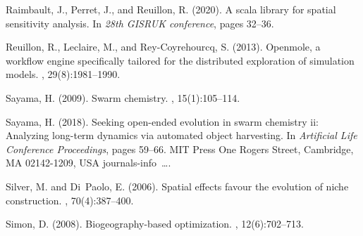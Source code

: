 \documentclass[letterpaper]{article}
\begin{document}
\begin{thebibliography}{}
Raimbault, J., Perret, J., and Reuillon, R. (2020).
\newblock A scala library for spatial sensitivity analysis.
\newblock In {\em 28th GISRUK conference}, pages 32--36.

Reuillon, R., Leclaire, M., and Rey-Coyrehourcq, S. (2013).
\newblock Openmole, a workflow engine specifically tailored for the distributed
  exploration of simulation models.
, 29(8):1981--1990.

Sayama, H. (2009).
\newblock Swarm chemistry.
, 15(1):105--114.

Sayama, H. (2018).
\newblock Seeking open-ended evolution in swarm chemistry ii: Analyzing
  long-term dynamics via automated object harvesting.
\newblock In {\em Artificial Life Conference Proceedings}, pages 59--66. MIT
  Press One Rogers Street, Cambridge, MA 02142-1209, USA journals-info~….

Silver, M. and Di~Paolo, E. (2006).
\newblock Spatial effects favour the evolution of niche construction.
, 70(4):387--400.

Simon, D. (2008).
\newblock Biogeography-based optimization.
, 12(6):702--713.

\end{thebibliography}
\end{document}
